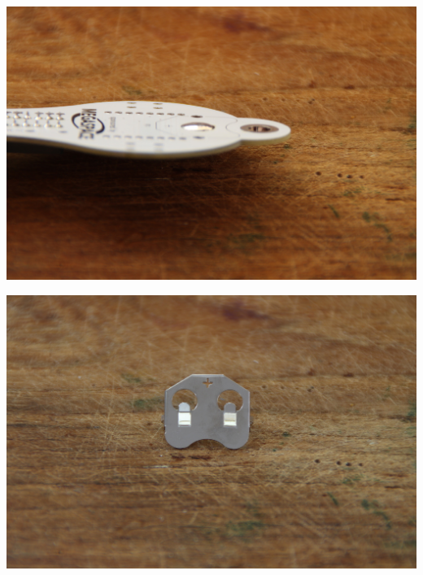 \documentclass{article}
\begin{document}
\begin{minipage}[b]{0.5\textwidth}
	\includegraphics[width=\textwidth]{Bilder2023/IMG_8361.JPG}
\end{minipage}
\begin{minipage}[b]{0.5\textwidth}
	\includegraphics[width=\textwidth]{Bilder2023/IMG_8362.JPG}
\end{minipage}

\vspace{0.5cm}
\end{document}
